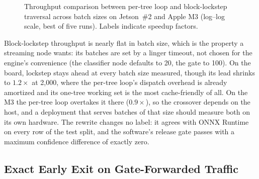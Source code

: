 \documentclass[runningheads]{llncs}
\begin{document}
\begin{figure}[t]
  \caption{Throughput comparison between per-tree loop and block-lockstep traversal across batch sizes on Jetson~\#2 and Apple M3 (log--log scale, best of five runs). Labels indicate speedup factors.}
  \label{fig:lockstep}
\end{figure}

Block-lockstep throughput is nearly flat in batch size, which is the property a streaming node wants: its batches are set by a linger timeout, not chosen for the engine's convenience (the classifier node defaults to 20, the gate to 100). On the board, lockstep stays ahead at every batch size measured, though its lead shrinks to $1.2\times$ at 2{,}000, where the per-tree loop's dispatch overhead is already amortized and its one-tree working set is the most cache-friendly of all. On the M3 the per-tree loop overtakes it there ($0.9\times$), so the crossover depends on the host, and a deployment that serves batches of that size should measure both on its own hardware. The rewrite changes no label: it agrees with ONNX Runtime on every row of the test split, and the software's release gate passes with a maximum confidence difference of exactly zero.

\subsection{Exact Early Exit on Gate-Forwarded Traffic}
\label{sec:earlyexit}
\end{document}
